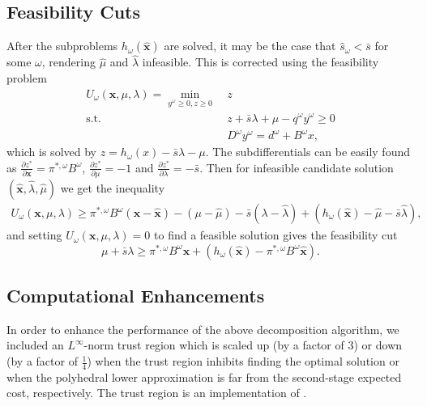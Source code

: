 \documentclass[opre,nonblindrev]{informs3} %
\newcommand{\x}{\mathbf{x}}
\newcommand{\xh}{\hat{\x}}
\newcommand{\lh}{\hat{\lambda}}
\newcommand{\mh}{\hat{\mu}}
\newcommand{\st}{\mbox{s.t.}}
\begin{document}
\subsection{Feasibility Cuts}
After the subproblems $h_\omega(\xh)$ are solved, it may be the case that $\hat{s}_\omega < \bar{s}$ for some $\omega$, rendering $\mh$ and $\lh$ infeasible.
This is corrected using the feasibility problem
\begin{align*}
	U_\omega(\x,\mu,\lambda) = \min_{y^\omega \geq 0, z \geq 0} \ & z \\
	\st \ & z + \bar{s}\lambda + \mu - q^\omega y^\omega \geq 0 \\
	& D^\omega y^\omega = d^\omega + B^\omega x,
\end{align*}
which is solved by $z = h_\omega(x) - \bar{s}\lambda - \mu$.
The subdifferentials can be easily found as $\frac{\partial z^*}{\partial \x} = \pi^{*,\omega} B^\omega$, $\frac{\partial z^*}{\partial \mu} = -1$ and $\frac{\partial z^*}{\partial \lambda} = -\bar{s}$.
Then for infeasible candidate solution $(\xh,\lh,\mh)$ we get the inequality
\begin{align*}
	U_\omega(\x,\mu,\lambda) \geq \pi^{*,\omega}B^\omega(\x-\xh) - (\mu -\mh) - \bar{s}(\lambda - \lh) + (h_\omega(\xh) - \mh - \bar{s}\lh),
\end{align*}
and setting $U_\omega(\x,\mu,\lambda) = 0$ to find a feasible solution gives the feasibility cut
\[
	\mu + \bar{s} \lambda \geq \pi^{*,\omega}B^\omega \x + (h_\omega(\xh) - \pi^{*,\omega}B^\omega\xh).
\]


\subsection{Computational Enhancements}

In order to enhance the performance of the above decomposition algorithm, we included an $L^\infty$-norm trust region which is scaled up (by a factor of $3$) or down (by a factor of $\tfrac{1}{4}$) when the trust region inhibits finding the optimal solution or when the polyhedral lower approximation is far from the second-stage expected cost, respectively.
The trust region is an implementation of \citep[Algorithm 4.1]{nocedal1999numerical}.
\end{document}
